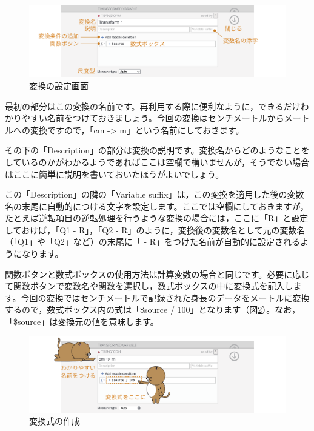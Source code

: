 \documentclass[
  12pt,
  a5jpaper,
  lualatex, ja=standard]{bxjsbook}
\begin{document}
\begin{figure}[!ht]

{\centering \includegraphics[width=1\linewidth]{images/basics/data-transformed-transform} 

}

\caption{変換の設定画面}\label{fig:data-transformed-transform}
\end{figure}

最初の部分はこの変換の名前です。再利用する際に便利なように，できるだけわかりやすい名前をつけておきましょう。今回の変換はセンチメートルからメートルへの変換ですので，「cm -\textgreater{} m」という名前にしておきます。

その下の「Description」の部分は変換の説明です。変換名からどのようなことをしているのかがわかるようであればここは空欄で構いませんが，そうでない場合はここに簡単に説明を書いておいたほうがよいでしょう。

この「Description」の隣の「Variable suffix」は，この変換を適用した後の変数名の末尾に自動的につける文字を設定します。ここでは空欄にしておきますが，たとえば逆転項目の逆転処理を行うような変換の場合には，ここに「R」と設定しておけば，「Q1 - R」，「Q2 - R」のように，変換後の変数名として元の変数名（「Q1」や「Q2」など）の末尾に「 - R」をつけた名前が自動的に設定されるようになります。

関数ボタンと数式ボックスの使用方法は計算変数の場合と同じです。必要に応じて関数ボタンで変数名や関数を選択し，数式ボックスの中に変換式を記入します。今回の変換ではセンチメートルで記録された身長のデータをメートルに変換するので，数式ボックス内の式は「\$source / 100」となります（図\ref{fig:data-transformed-transform-complete}）。なお，「\$source」は変換元の値を意味します。

\begin{figure}[!ht]

{\centering \includegraphics[width=1\linewidth]{images/basics/data-transformed-transform-complete} 

}

\caption{変換式の作成}\label{fig:data-transformed-transform-complete}
\end{figure}
\end{document}

